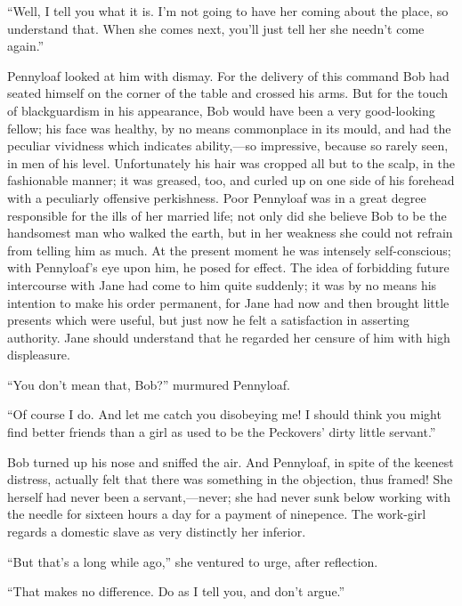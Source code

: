 ``Well, I tell you what it is. I'm not going to have her coming about
the place, so understand that. When she comes next, you'll just tell her
she needn't come again.''

Pennyloaf looked at him with dismay. For the delivery of this command
Bob had seated himself on the corner of the table and crossed his arms.
But for the touch of blackguardism in his appearance, Bob would have
been a very good-looking fellow; his face was healthy, by no means
commonplace in its mould, and had the peculiar vividness which
{}indicates ability,---so impressive, because so rarely seen, in men of
his level. Unfortunately his hair was cropped all but to the scalp, in
the fashionable manner; it was greased, too, and curled up on one side
of his forehead with a peculiarly offensive perkishness. Poor Pennyloaf
was in a great degree responsible for the ills of her married life; not
only did she believe Bob to be the handsomest man who walked the earth,
but in her weakness she could not refrain from telling him as much. At
the present moment he was intensely self-conscious; with Pennyloaf's eye
upon him, he posed for effect. The idea of forbidding future intercourse
with Jane had come to him quite suddenly; it was by no means his
intention to make his order permanent, for Jane had now and then brought
little presents which were useful, but just now he felt a satisfaction
in asserting authority. Jane should understand that he regarded her
censure of him with high displeasure.

``You don't mean that, Bob?'' murmured Pennyloaf.

{}``Of course I do. And let me catch you disobeying me! I should think
you might find better friends than a girl as used to be the Peckovers'
dirty little servant.''

Bob turned up his nose and sniffed the air. And Pennyloaf, in spite of
the keenest distress, actually felt that there was something in the
objection, thus framed! She herself had never been a servant,---never;
she had never sunk below working with the needle for sixteen hours a day
for a payment of ninepence. The work-girl regards a domestic slave as
very distinctly her inferior.

``But that's a long while ago,'' she ventured to urge, after reflection.

``That makes no difference. Do as I tell you, and don't argue.''

